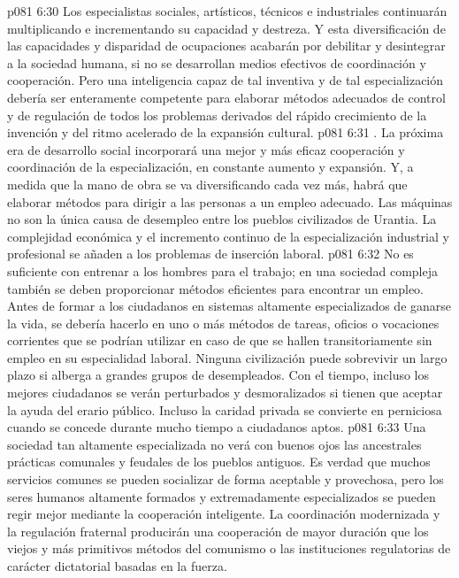 \vs p081 6:30 Los especialistas sociales, artísticos, técnicos e industriales continuarán multiplicando e incrementando su capacidad y destreza. Y esta diversificación de las capacidades y disparidad de ocupaciones acabarán por debilitar y desintegrar a la sociedad humana, si no se desarrollan medios efectivos de coordinación y cooperación. Pero una inteligencia capaz de tal inventiva y de tal especialización debería ser enteramente competente para elaborar métodos adecuados de control y de regulación de todos los problemas derivados del rápido crecimiento de la invención y del ritmo acelerado de la expansión cultural.
\vs p081 6:31 . La próxima era de desarrollo social incorporará una mejor y más eficaz cooperación y coordinación de la especialización, en constante aumento y expansión. Y, a medida que la mano de obra se va diversificando cada vez más, habrá que elaborar métodos para dirigir a las personas a un empleo adecuado. Las máquinas no son la única causa de desempleo entre los pueblos civilizados de Urantia. La complejidad económica y el incremento continuo de la especialización industrial y profesional se añaden a los problemas de inserción laboral.
\vs p081 6:32 No es suficiente con entrenar a los hombres para el trabajo; en una sociedad compleja también se deben proporcionar métodos eficientes para encontrar un empleo. Antes de formar a los ciudadanos en sistemas altamente especializados de ganarse la vida, se debería hacerlo en uno o más métodos de tareas, oficios o vocaciones corrientes que se podrían utilizar en caso de que se hallen transitoriamente sin empleo en su especialidad laboral. Ninguna civilización puede sobrevivir un largo plazo si alberga a grandes grupos de desempleados. Con el tiempo, incluso los mejores ciudadanos se verán perturbados y desmoralizados si tienen que aceptar la ayuda del erario público. Incluso la caridad privada se convierte en perniciosa cuando se concede durante mucho tiempo a ciudadanos aptos.
\vs p081 6:33 Una sociedad tan altamente especializada no verá con buenos ojos las ancestrales prácticas comunales y feudales de los pueblos antiguos. Es verdad que muchos servicios comunes se pueden socializar de forma aceptable y provechosa, pero los seres humanos altamente formados y extremadamente especializados se pueden regir mejor mediante la cooperación inteligente. La coordinación modernizada y la regulación fraternal producirán una cooperación de mayor duración que los viejos y más primitivos métodos del comunismo o las instituciones regulatorias de carácter dictatorial basadas en la fuerza.
